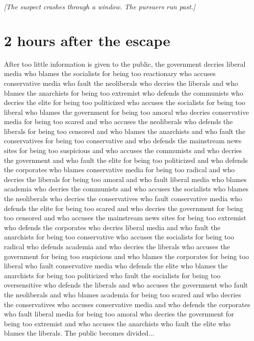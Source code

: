 \documentclass{report}
\begin{document}
\textit{[The suspect crashes through a window. The pursuers run past.]}


\section*{2 \small{hours after the escape}}

After too little information is given to the public, the government decries liberal media who blames the socialists for being too reactionary who accuses conservative media who fault the neoliberals who decries the liberals and who blames the anarchists for being too extremist who defends the communists who decries the elite for being too politicized who accuses the socialists for being too liberal who blames the government for being too amoral who decries conservative media for being too scared and who accuses the neoliberals who defends the liberals for being too censored and who blames the anarchists and who fault the conservatives for being too conservative and who defends the mainstream news sites for being too suspicious and who accuses the communists and who decries the government and who fault the elite for being too politicized and who defends the corporates who blames conservative media for being too radical and who decries the liberals for being too amoral and who fault liberal media who blames academia who decries the communists and who accuses the socialists who blames the neoliberals who decries the conservatives who fault conservative media who defends the elite for being too scared and who decries the government for being too censored and who accuses the mainstream news sites for being too extremist who defends the corporates who decries liberal media and who fault the anarchists for being too conservative who accuses the socialists for being too radical who defends academia and who decries the liberals who accuses the government for being too suspicious and who blames the corporates for being too liberal who fault conservative media who defends the elite who blames the anarchists for being too politicized who fault the socialists for being too oversensitive who defends the liberals and who accuses the government who fault the neoliberals and who blames academia for being too scared and who decries the conservatives who accuses conservative media and who defends the corporates who fault liberal media for being too amoral who decries the government for being too extremist and who accuses the anarchists who fault the elite who blames the liberals. The public becomes divided...
\end{document}
